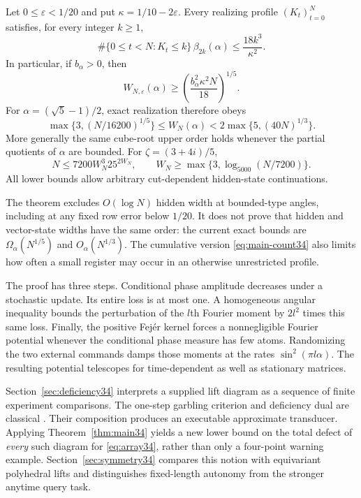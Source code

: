 \begin{theorem}
\label{thm:main34}
Let $0\le\varepsilon<1/20$ and put $\kappa=1/10-2\varepsilon$.
Every realizing profile $(K_t)_{t=0}^N$ satisfies, for every integer $k\ge1$,
\begin{equation}\label{eq:main-count34}
 \#\{0\le t<N:K_t\le k\}\,\beta_{2k}(\alpha)
                       \le \frac{18k^3}{\kappa^2}.
\end{equation}
In particular, if $b_\alpha>0$, then
\begin{equation}\label{eq:main-lower34}
 W_{N,\varepsilon}(\alpha)
       \ge \left(\frac{b_\alpha^2\kappa^2 N}{18}\right)^{1/5}.
\end{equation}
For $\alpha=(\sqrt5-1)/2$, exact realization therefore obeys
\begin{equation}\label{eq:golden34}
 \max\{3,(N/16200)^{1/5}\}\le W_N(\alpha)
       <2\max\{5,(40N)^{1/3}\}.
\end{equation}
More generally the same cube-root upper order holds whenever the partial
quotients of $\alpha$ are bounded. For $\zeta=(3+4i)/5$,
\begin{equation}\label{eq:rational-head34}
 N\le7200 W_N^3 25^{2W_N},\qquad
 W_N\ge\max\{3,\log_{5000}(N/7200)\}.
\end{equation}
All lower bounds allow arbitrary cut-dependent hidden-state continuations.
\end{theorem}

The theorem excludes $O(\log N)$ hidden width at bounded-type angles,
including at any fixed row error below $1/20$. It does not prove that
hidden and vector-state widths have the same order: the current exact
bounds are $\Omega_\alpha(N^{1/5})$ and $O_\alpha(N^{1/3})$.
The cumulative version \eqref{eq:main-count34} also limits how often a
small register may occur in an otherwise unrestricted profile.

The proof has three steps. Conditional phase amplitude decreases under a
stochastic update. Its entire loss is at most one. A homogeneous angular
inequality bounds the perturbation of the $l$th Fourier moment by
$2l^2$ times this same loss. Finally, the positive Fej\'er kernel forces
a nonnegligible Fourier potential whenever the conditional phase measure
has few atoms. Randomizing the two external commands damps those moments
at the rates $\sin^2(\pi l\alpha)$. The resulting potential telescopes
for time-dependent as well as stationary matrices.

Section~\ref{sec:deficiency34} interprets a supplied lift diagram as a
sequence of finite experiment comparisons. The one-step garbling criterion
and deficiency dual are classical \cite{Blackwell,Torgersen}. Their
composition produces an executable approximate transducer. Applying
Theorem~\ref{thm:main34} yields a new lower bound on the total defect of
\emph{every} such diagram for \eqref{eq:array34}, rather than only a
four-point warning example. Section~\ref{sec:symmetry34} compares this
notion with equivariant polyhedral lifts and distinguishes fixed-length
autonomy from the stronger anytime query task.

